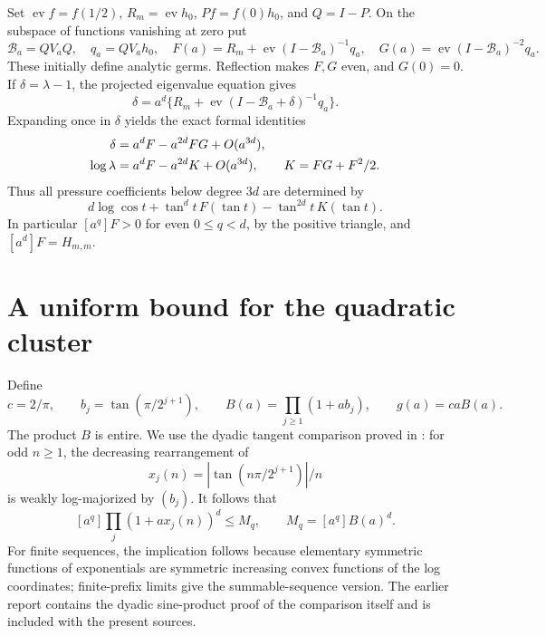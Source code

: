 \documentclass[11pt,a4paper]{article}
\theoremstyle{remark}\newtheorem*{ednote}{Editorial note (ProveIt, 2026-10-01)}
\newcommand{\ev}{\operatorname{ev}}\newcommand{\Z}{\mathbb Z}\newcommand{\C}{\mathbb C}
\begin{document}
Set $\ev f=f(1/2)$, $R_m=\ev h_0$, $Pf=f(0)h_0$, and $Q=I-P$. On the subspace of functions vanishing at zero put
\[
 \mathcal B_a=QV_aQ,\quad q_a=QV_ah_0,\quad
 F(a)=R_m+\ev(I-\mathcal B_a)^{-1}q_a,\quad
 G(a)=\ev(I-\mathcal B_a)^{-2}q_a.
\]
These initially define analytic germs. Reflection makes $F,G$ even, and $G(0)=0$. If $\delta=\lambda-1$, the projected eigenvalue equation gives
\[
 \delta=a^d\{R_m+\ev(I-\mathcal B_a+\delta)^{-1}q_a\}.
\]
Expanding once in $\delta$ yields the exact formal identities
\begin{align}
 \delta&=a^dF-a^{2d}FG+O(a^{3d}),\notag\\
 \log\lambda&=a^dF-a^{2d}K+O(a^{3d}),\qquad K=FG+F^2/2.\label{eq:clusters}
\end{align}
Thus all pressure coefficients below degree $3d$ are determined by
\begin{equation}\label{eq:pressure}
 d\log\cos t+\tan^d t\,F(\tan t)-\tan^{2d}t\,K(\tan t).
\end{equation}
In particular $[a^q]F>0$ for even $0\le q<d$, by the positive triangle, and $[a^d]F=H_{m,m}$.

\section{A uniform bound for the quadratic cluster}
Define
\[
 c=2/\pi,\qquad b_j=\tan(\pi/2^{j+1}),\qquad
 B(a)=\prod_{j\ge1}(1+ab_j),\qquad g(a)=caB(a).
\]
The product $B$ is entire. We use the dyadic tangent comparison proved in \cite{triangle}: for odd $n\ge1$, the decreasing rearrangement of
\[
 x_j(n)=|\tan(n\pi/2^{j+1})|/n
\]
is weakly log-majorized by $(b_j)$. It follows that
\begin{equation}\label{eq:majorization}
 [a^q]\prod_j(1+ax_j(n))^d\le M_q,\qquad M_q=[a^q]B(a)^d.
\end{equation}
For finite sequences, the implication follows because elementary symmetric functions of exponentials are symmetric increasing convex functions of the log coordinates; finite-prefix limits give the summable-sequence version. The earlier report contains the dyadic sine-product proof of the comparison itself and is included with the present sources.
\end{document}
